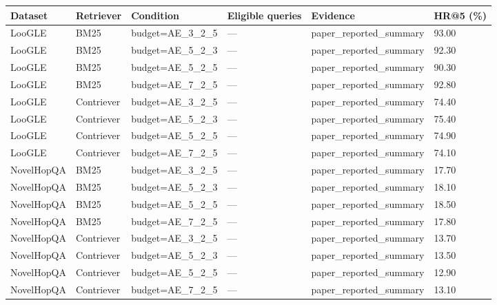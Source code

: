 \begin{tabular}{llllll}
\hline
Dataset & Retriever & Condition & Eligible queries & Evidence & HR@5 (\%) \\
\hline
LooGLE & BM25 & budget=AE\_3\_2\_5 & — & paper\_reported\_summary & 93.00 \\
LooGLE & BM25 & budget=AE\_5\_2\_3 & — & paper\_reported\_summary & 92.30 \\
LooGLE & BM25 & budget=AE\_5\_2\_5 & — & paper\_reported\_summary & 90.30 \\
LooGLE & BM25 & budget=AE\_7\_2\_5 & — & paper\_reported\_summary & 92.80 \\
LooGLE & Contriever & budget=AE\_3\_2\_5 & — & paper\_reported\_summary & 74.40 \\
LooGLE & Contriever & budget=AE\_5\_2\_3 & — & paper\_reported\_summary & 75.40 \\
LooGLE & Contriever & budget=AE\_5\_2\_5 & — & paper\_reported\_summary & 74.90 \\
LooGLE & Contriever & budget=AE\_7\_2\_5 & — & paper\_reported\_summary & 74.10 \\
NovelHopQA & BM25 & budget=AE\_3\_2\_5 & — & paper\_reported\_summary & 17.70 \\
NovelHopQA & BM25 & budget=AE\_5\_2\_3 & — & paper\_reported\_summary & 18.10 \\
NovelHopQA & BM25 & budget=AE\_5\_2\_5 & — & paper\_reported\_summary & 18.50 \\
NovelHopQA & BM25 & budget=AE\_7\_2\_5 & — & paper\_reported\_summary & 17.80 \\
NovelHopQA & Contriever & budget=AE\_3\_2\_5 & — & paper\_reported\_summary & 13.70 \\
NovelHopQA & Contriever & budget=AE\_5\_2\_3 & — & paper\_reported\_summary & 13.50 \\
NovelHopQA & Contriever & budget=AE\_5\_2\_5 & — & paper\_reported\_summary & 12.90 \\
NovelHopQA & Contriever & budget=AE\_7\_2\_5 & — & paper\_reported\_summary & 13.10 \\
\hline
\end{tabular}
